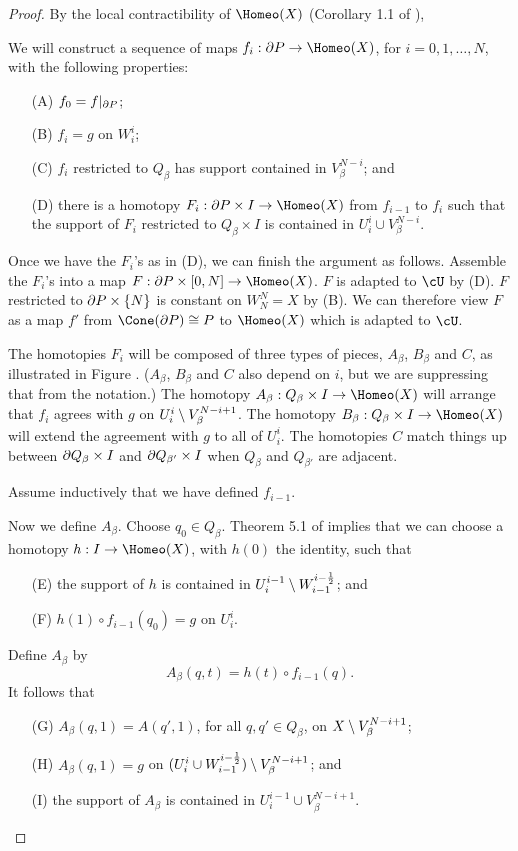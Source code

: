 {\begin{proof}
By the local contractibility of $\Homeo(X)$ (Corollary 1.1 of \cite{MR0283802}), 

We will construct a sequence of maps $f_i : \bd P\to \Homeo(X)$, for $i = 0, 1, \ldots, N$, with the following properties:
\begin{itemize}
\item[(A)] $f_0 = f|_{\partial P}$;
\item[(B)] $f_i = g$ on $W_i^i$;
\item[(C)] $f_i$ restricted to $Q_\beta$ has support contained in $V_\beta^{N-i}$; and
\item[(D)] there is a homotopy $F_i : \bd P\times I \to \Homeo(X)$ from $f_{i-1}$ to $f_i$ such that the 
support of $F_i$ restricted to $Q_\beta\times I$ is contained in $U_i^i\cup V_\beta^{N-i}$.
\end{itemize}

Once we have the $F_i$'s as in (D), we can finish the argument as follows.
Assemble the $F_i$'s into a map $F: \bd P\times [0,N] \to \Homeo(X)$.
$F$ is adapted to $\cU$ by (D).
$F$ restricted to $\partial P\times\{N\}$ is constant on $W_N^N = X$ by (B).
We can therefore view $F$ as a map $f'$ from $\Cone(\bd P) \cong P$ to $\Homeo(X)$
which is adapted to $\cU$.

The homotopies $F_i$ will be composed of three types of pieces, $A_\beta$, $B_\beta$ and $C$, %
as illustrated in Figure .
($A_\beta$, $B_\beta$ and $C$ also depend on $i$, but we are suppressing that from the notation.)
The homotopy $A_\beta : Q_\beta \times I \to \Homeo(X)$ will arrange that $f_i$ agrees with $g$
on $U_i^i \setminus V_\beta^{N-i+1}$.
The homotopy $B_\beta : Q_\beta \times I \to \Homeo(X)$ will extend the agreement with $g$ to all of $U_i^i$.
The homotopies $C$ match things up between $\partial Q_\beta \times I$ and $\partial Q_{\beta'} \times I$ when
$Q_\beta$ and $Q_{\beta'}$ are adjacent.

Assume inductively that we have defined $f_{i-1}$.

Now we define $A_\beta$.
Choose $q_0\in Q_\beta$.
Theorem 5.1 of \cite{MR0283802} implies that we can choose a homotopy $h:I \to \Homeo(X)$, with $h(0)$ the identity, such that
\begin{itemize}
\item[(E)] the support of $h$ is contained in $U_i^{i-1} \setminus W_{i-1}^{i-\frac12}$; and
\item[(F)] $h(1) \circ f_{i-1}(q_0) = g$ on $U_i^i$.
\end{itemize}
Define $A_\beta$ by
\[
	A_\beta(q, t) = h(t) \circ f_{i-1}(q) .
\]
It follows that
\begin{itemize}
\item[(G)] $A_\beta(q,1) = A(q',1)$, for all $q,q' \in Q_\beta$, on $X \setminus V_\beta^{N-i+1}$;
\item[(H)] $A_\beta(q, 1) = g$ on $(U_i^i \cup W_{i-1}^{i-\frac12})\setminus V_\beta^{N-i+1}$; and
\item[(I)] the support of $A_\beta$ is contained in $U_i^{i-1} \cup V_\beta^{N-i+1}$.
\end{itemize}


\end{proof}}
